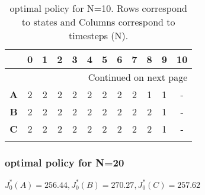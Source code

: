 \documentclass{article}
\begin{document}
\begin{longtable}{|c|c|c|c|c|c|c|c|c|c|c|c|}
\toprule
{} &  0  &  1  &  2  &  3  &  4  &  5  &  6  &  7  &  8  &  9  & 10 \\
\midrule
\endhead
\midrule
\multicolumn{12}{r}{{Continued on next page}} \\
\midrule
\endfoot

\bottomrule
\endlastfoot
\textbf{A} &   2 &   2 &   2 &   2 &   2 &   2 &   2 &   2 &   1 &   1 &  - \\\hline
\textbf{B} &   2 &   2 &   2 &   2 &   2 &   2 &   2 &   2 &   2 &   1 &  - \\\hline
\textbf{C} &   2 &   2 &   2 &   2 &   2 &   2 &   2 &   2 &   2 &   1 &  - \\\hline
\caption{optimal policy for N=10. Rows correspond to states and Columns correspond to timesteps (N).}
\end{longtable}

\clearpage
\subsubsection*{optimal policy for N=20}

$J_0^*(A) = 256.44, J_0^*(B) = 270.27, J_0^*(C) = 257.62$
\end{document}
